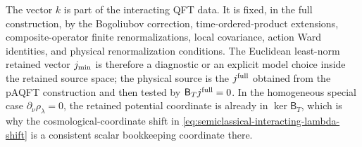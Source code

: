 The vector \(k\) is part of the interacting QFT data.  It is fixed, in the
full construction, by the Bogoliubov correction, time-ordered-product
extensions, composite-operator finite renormalizations, local covariance, action
Ward identities, and physical renormalization conditions.  The Euclidean
least-norm retained vector \(j_{\rm min}\) is therefore a diagnostic or an
explicit model choice inside the retained source space; the physical source is
the \(j^{\rm full}\) obtained from the pAQFT construction and then tested by
\(\mathsf B_T j^{\rm full}=0\).
In the homogeneous special case \(\partial_\nu\rho_\lambda=0\), the retained
potential coordinate is already in \(\ker\mathsf B_T\), which is why the
cosmological-coordinate shift in
\eqref{eq:semiclassical-interacting-lambda-shift} is a consistent scalar
bookkeeping coordinate there.

